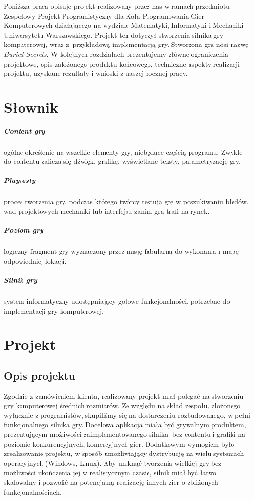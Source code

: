 \documentclass[licencjacka]{pracamgr}
\begin{document}
  Poniższa praca opisuje projekt realizowany przez nas w ramach przedmiotu Zespołowy Projekt Programistyczny dla 
  Koła Programowania Gier Komputerowych działającego na wydziale Matematyki, Informatyki i Mechaniki Uniwersytetu Warszawskiego.
  Projekt ten dotyczył stworzenia silnika gry komputerowej, wraz z~przykładową implementacją gry. Stworzona gra nosi nazwę
  \emph{Buried Secrets}. W kolejnych rozdziałach prezentujemy główne ograniczenia projektowe, opis założonego produktu końcowego,
  techniczne aspekty realizacji projektu, uzyskane rezultaty i wnioski z naszej rocznej pracy.


\chapter{Słownik}
  \paragraph{Content gry} ogólne określenie na wszelkie elementy gry, niebędące częścią programu. Zwykle do contentu zalicza się
    dźwięk, grafikę, wyświetlane teksty, parametryzację gry.
  \paragraph{Playtesty} proces tworzenia gry, podczas którego twórcy testują grę w poszukiwaniu błędów, wad projektowych mechaniki
    lub interfejsu zanim gra trafi na rynek.
  \paragraph{Poziom gry} logiczny fragment gry wyznaczony przez misję fabularną do wykonania i mapę odpowiedniej lokacji.
  \paragraph{Silnik gry} system informatyczny udostępniający gotowe funkcjonalności, potrzebne do implementacji gry komputerowej.

\chapter{Projekt}

  \section{Opis projektu}
    Zgodnie z zamówieniem klienta, realizowany projekt miał polegać na stworzeniu gry komputerowej
    średnich rozmiarów. Ze względu na skład zespołu, złożonego wyłącznie z programistów, skupiliśmy się
    na dostarczeniu rozbudowanego, w pełni funkcjonalnego silnika gry.
    Docelowa aplikacja miała być grywalnym produktem, prezentującym możliwości zaimplementowanego silnika,
    bez contentu i grafiki na poziomie konkurencyjnych, komercyjnych gier. Dodatkowym wymogiem było zrealizowanie
    projektu, w sposób umożliwiający dystrybucję na wielu systemach operacyjnych (Windows, Linux). Aby uniknąć
    tworzenia wielkiej gry bez możliwości ukończenia jej w realistycznym czasie, silnik miał być łatwo skalowalny
    i pozwolić na potencjalną realizację innych gier o zbliżonych funkcjonalnościach.
\end{document}
